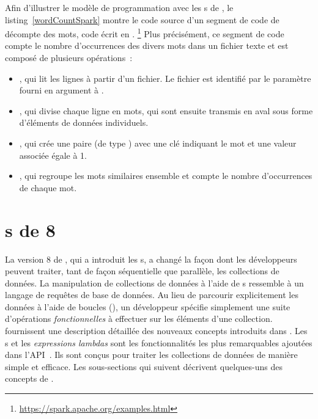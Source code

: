 Afin d'illustrer le mod\`ele de programmation avec les s de , le listing~\ref{wordCountSpark} montre le code source d'un segment de code de d\'ecompte des mots, code \'ecrit en .%
%
\footnote{\url{https://spark.apache.org/examples.html}}
%
Plus pr\'ecis\'ement, ce segment de code compte le nombre d'occurrences des divers mots dans un fichier texte et est compos\'e de plusieurs op\'erations~: 
\begin{itemize}

\item {}, qui lit les lignes \`a partir d'un fichier. Le fichier est identifi\'e par le param\`etre fourni en argument \`a .

\item {}, qui divise chaque ligne en mots, qui sont ensuite transmis en aval sous forme d'\'el\'ements de donn\'ees individuels.

\item {}, qui cr\'ee une paire (de type ) avec une cl\'e indiquant le mot et une valeur associ\'ee \'egale \`a 1.

\item {}, qui regroupe les mots similaires ensemble et compte le nombre d'occurrences de chaque mot.


\end{itemize}



\section{s de  8}
\label{java8.sect}

La version 8 de , qui a introduit les s, a chang\'e la façon dont les d\'eveloppeurs peuvent traiter, tant de fa\c{c}on s\'equentielle que parall\`ele, les collections de donn\'ees. La manipulation de collections de donn\'ees \`a l'aide de s ressemble \`a un langage de requ\^etes de base de donn\'ees. Au lieu de parcourir explicitement les donn\'ees \`a l'aide de boucles (), un d\'eveloppeur sp\'ecifie simplement une suite d'op\'erations \emph{fonctionnelles} \`a effectuer sur les \'el\'ements d'une collection. \cite{urma2014java} fournissent une description d\'etaill\'ee des nouveaux concepts introduits dans . Les s et les \emph{expressions lambdas} sont les fonctionnalit\'es les plus remarquables ajout\'ees dans l'API~\citep{javaStreamAPI}. Ils sont con\c{c}us pour traiter les collections de donn\'ees de mani\`ere simple et efficace. Les sous-sections qui suivent d\'ecrivent quelques-uns des concepts de .


